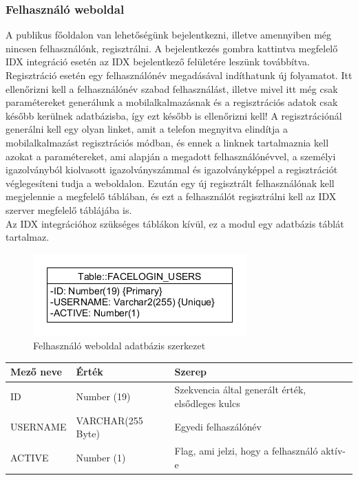 \subsubsection{Felhasználó weboldal}
A publikus főoldalon van lehetőségünk bejelentkezni, illetve amennyiben még nincsen felhasználónk, regisztrálni. A bejelentkezés gombra kattintva megfelelő IDX integráció esetén az IDX bejelentkező felületére leszünk továbbítva. Regisztráció esetén egy felhasználónév megadásával indíthatunk új folyamatot. Itt ellenőrizni kell a felhasználónév szabad felhasználást, illetve mivel itt még csak paramétereket generálunk a mobilalkalmazásnak és a regisztrációs adatok csak később kerülnek adatbázisba, így ezt később is ellenőrizni kell! A regisztrációnál generálni kell egy olyan linket, amit a telefon megnyitva elindítja a mobilalkalmazást regisztrációs módban, és ennek a linknek tartalmaznia kell azokat a paramétereket, ami alapján a megadott felhasználónévvel, a személyi igazolványból kiolvasott igazolványszámmal és igazolványképpel a regisztrációt véglegesíteni tudja a weboldalon.
Ezután egy új regisztrált felhasználónak kell megjelennie a megfelelő táblában, és ezt a felhasználót regisztrálni kell az IDX szerver megfelelő táblájába is.
\\Az IDX integrációhoz szükséges táblákon kívül, ez a modul egy adatbázis táblát tartalmaz.

\begin{figure}[h]
 \begin{minipage}{1\textwidth} 
\centering
    \includegraphics[scale=0.7]{img/facelogin_db}
    \caption{Felhasználó weboldal adatbázis szerkezet}
 \end{minipage}
\end{figure}


	\begin{tabular}{|p{4cm}|p{3cm} |p{4cm}|}
   	\hline
	\textbf{Mező neve} & \textbf{Érték} & \textbf{Szerep}\\ \hline
	ID & Number (19) & Szekvencia által generált érték, elsődleges kulcs \\ \hline
	USERNAME & VARCHAR(255 Byte) & Egyedi felhaszálónév  \\ \hline
	ACTIVE & Number (1) & Flag, ami jelzi, hogy a felhasználó aktív-e \\ \hline
	\end{tabular}

